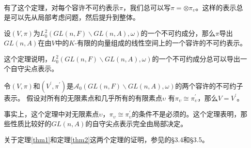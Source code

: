   有了这个定理，对每个容许不可约表示$\pi$，我们总可以写$\pi =
  \otimes
  \pi_{\upsilon}$。这样的表示总是可以先从局部考虑问题，然后提升到整体。

  \begin{theorem}
  设$(V,\pi)$为$L_0^2(GL(n,F)\backslash
  GL(n,A),\omega)$的一个不可约成分，那么$\pi$导出$GL(n,A)$在由$V$中的$K$-有限的向量组成的线性空间上的一个容许的不可约表示。
  \end{theorem}

   这个定理说明，$L_0^2(GL(n,F)\backslash
   GL(n,A),\omega)$的一个不可约成分总可以导出一个自守尖点表示。

  \begin{theorem}
  \label{thm2}
  令$(V,\pi)$和$(V^{\prime},\pi^{\prime})$是$\mathcal
  {A}_0(GL(n,F)\backslash GL(n,A),\omega)$的两个容许的不可约子表示。
  假设对所有的无限素点和几乎所有的有限素点$\upsilon$
  有$\pi_{\upsilon}\cong \pi_{\upsilon}^{\prime}$，那么$V =
  V^{\prime}$。
  \end{theorem}

  事实上，这个定理中对无限素点$\upsilon$，$\pi_{\upsilon}\cong
  \pi_{\upsilon}^{\prime}$的条件不是必须的。这个定理表明，那些性质比较好的$GL(n,A)$的自守尖点表示完全由局部决定。

  关于定理\ref{thm1}和定理\ref{thm2}这两个定理的证明，参见的\S 3.4和\S3.5。

